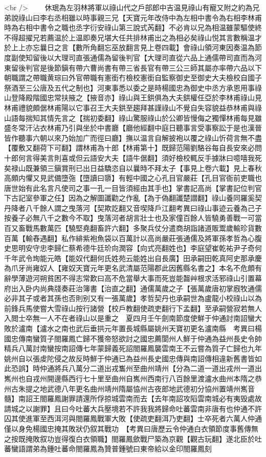 <br />
　　休珉為左羽林將軍以祿山代之戶部郎中吉温見祿山有寵又附之約為兄弟說祿山曰李右丞相雖以時事親三兄【天寶元年改侍中為左相中書令為右相李林甫時為右相中書令之職也丞字衍安祿山第三說式芮翻】不必肯以兄為相温雖蒙驅使終不得超擢兄若薦温於上温即奏兄堪大任共排林甫出之為相必矣祿山悦其言數稱温才於上上亦忘曩日之言【數所角翻忘巫放翻言見上卷四載】會祿山領河東因奏温為節度副使知留後以大理司直張通儒為留後判官【大理司直從六品上通儒帶司直而為河東留後判官是後節鎭有帶六曹尚書有帶三省長官有帶三公三師其屬亦率帶六品以下朝職謂之帶職黄琮曰外官帶職有憲銜冇檢校憲銜自監察御史至御史大夫檢校自國子祭酒至三公唐及五代之制也】河東事悉以委之是時楊國忠為御史中丞方承恩用事祿山登降殿階國忠常扶掖之【掖音亦】祿山與王鉷俱為大夫鉷權任亞於李林甫祿山見林甫禮貌頗倨林甫陽以它事召王大夫鉷至趨拜甚謹祿山不覺自失容貌益恭林甫與祿山語每揣知其情先言之【揣初委翻】祿山驚服祿山於公卿皆慢侮之獨憚林甫每見雖盛冬常汗沾衣林甫乃引與坐於中書廳【廳他經翻中庭日聽事言受事察訟于是也漢晉皆作聽事六朝以來乃始加广而徑曰廳】撫以温言自解披袍以覆之祿山忻荷言無不盡【覆敷又翻荷下可翻】謂林甫為十郎【林甫第十】既歸范陽劉駱谷每自長安來必問十郎何言得美言則喜或但云語安大夫【語牛倨翻】須好檢校輒反手據牀曰噫嘻我死矣禄山既兼領三鎭賞刑已出日益驕恣自以曩時不拜太子【事見上卷六載】見上春秋高頗内懼又見武備墮㢮【墮讀曰隳】有輕中國之心孔目官嚴莊【孔目官衙前吏職也唐世始有此名言凡使司之事一孔一目皆須經由其手也】掌書記高尚【掌書記位判官下古記室參軍之任】因為之解圖讖勸之作亂【為于偽翻讖楚譛翻】祿山養同羅奚契丹降者八千餘人謂之曳落河【契欺訖翻又音喫降戶江翻考異曰祿山事迹云養為己子按養子必無八千之數今不取】曳落河者胡言壯士也及家僮百餘人皆驍勇善戰一可當百又畜戰馬數萬匹【驍堅堯翻畜許六翻】多聚兵仗分遣商胡詣諸道販鬻歲輸珍貨數百萬【輸舂遇翻】私作緋紫袍魚袋以百萬計以高尚嚴莊張通儒及將軍孫孝哲為心腹史思明安守忠李歸仁蔡希德牛廷玠向潤容【向式亮翻姓也】李庭望崔乾祐尹子奇何千年武令珣能元皓【能奴代翻何氏姓苑云能姓出自長廣】田承嗣田乾真阿史那承慶為爪牙尚雍奴人【雍奴天寶元年更名武清屬范陽郡此因舊縣名書之】本名不危頗有辭學薄遊河朔貧困不得志常歎曰高不危當舉大事而死豈能齧艸根求活邪祿山引置幕府出入卧内尚典牋奏莊治簿書【治直之翻】通儒萬歲之子【張萬歲唐初掌廐牧通儒必非其子或者其孫也否則别又有一張萬歲】孝哲契丹也承嗣世為盧龍小校祿山以為前鋒兵馬使嘗大雪祿山按行諸營【校戶教翻使疏吏翻行下孟翻】至承嗣營寂若無人入閲士卒無一人不在者祿山以是重之　夏四月壬午劍南節度使鮮于仲通討南詔蠻大敗於瀘南【瀘水之南也武后垂拱元年置長城縣屬姚州天寶初更名瀘南縣　考異曰楊國忠傳南蠻質子閤羅鳳亡歸不獲帝怒欲討之國忠薦閬州人鮮于仲通為益州長史令帥精兵八萬討南蠻按南詔傳七年蒙歸義死詔閤羅鳳襲雲南王不云嘗為質子亡歸也九年姚州自以張䖍陀侵之故反時鮮于仲通已為益州長史國忠傳與南詔傳相違新舊書皆如此恐誤】時仲通將兵八萬分二道出戎雟州至曲州靖州【分為二道一道出戎州一道出嶲州也自戎州開邊縣西行七十里至曲州自嶲州西南行八百餘里渡瀘水曲州本隋之恭州古朱提之地武德八年更名曲州靖州隋屬恊州古夜郎地武德初分協州置靖州嶲音髓】南詔王閤羅鳳謝罪請還所俘掠城雲南而去【去年南詔攻䧟雲南城必有夷毁處故請城之以謝罪】且曰今吐蕃大兵壓境若不許我我將歸命吐蕃雲南非唐有也仲通不許囚其使進軍至西洱河與閤羅鳳戰軍大敗【使疏吏翻洱乃吏翻】士卒死者六萬人仲通僅以身免楊國忠掩其敗狀仍叙其戰功　【考異曰唐歷云令仲通白衣領節度事舊傳無之按既掩敗叙功豈得復白衣領職】閤羅鳳歛戰尸築為京觀【觀古玩翻】遂北臣於吐蕃蠻語謂弟為鍾吐蕃命閤羅鳳為贊普鍾號曰東帝給以金印閤羅鳳刻